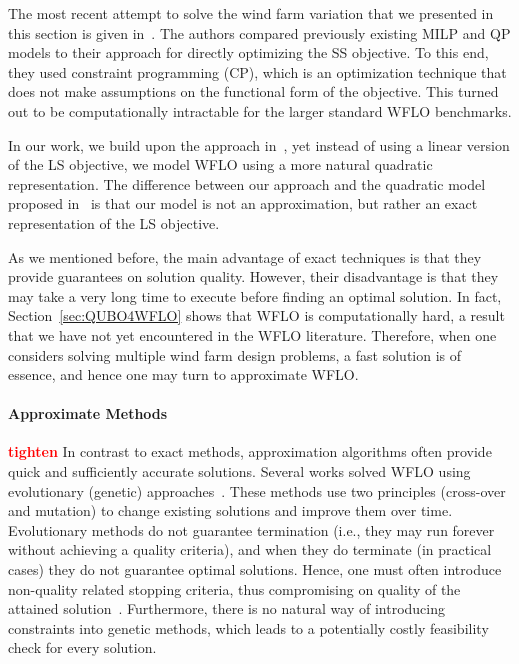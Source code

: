 \documentclass[preprint,12pt]{elsarticle}
\newcommand{\todo}[1]{{\textcolor{red}{\bf {#1}}}}
\begin{document}
The most recent attempt to solve the wind farm variation that we presented 
in this section is given in~\cite{Zhang2014}. The authors compared
previously existing MILP and QP models to their approach for directly optimizing the SS objective. To this end, they used constraint programming (CP), which 
is an optimization technique that does not make assumptions on the functional form of the objective.
This turned out to be computationally intractable for the larger standard WFLO benchmarks. 

In our work, we build upon the approach in~\cite{donovan2005wind}, yet instead of using a linear version of the LS objective, we 
model WFLO using a more natural quadratic representation. The difference between our approach and the quadratic model
proposed in~\cite{turner2014new} is that our model is not an approximation, but rather an exact representation of the LS objective.

As we mentioned before, the main advantage of exact techniques
is that they provide guarantees on solution quality. However, their disadvantage is
that they may take a very long time to execute before finding an optimal solution. 
In fact, Section~\ref{sec:QUBO4WFLO} shows that WFLO is computationally hard, a result
that we have not yet encountered in the WFLO literature. Therefore,
when one considers solving multiple wind farm design problems, a fast solution is of essence,
and hence one may turn to approximate WFLO.

\paragraph{Approximate Methods} \todo{tighten} In contrast to exact methods, approximation algorithms often provide   
quick and sufficiently accurate solutions. Several works solved 
WFLO using evolutionary (genetic) approaches~\cite{MOSETTI1994105,gonzalez2010optimization,grady2005placement}. 
These methods use two principles (cross-over and mutation)
to change existing solutions and improve them over time. Evolutionary methods do not guarantee termination 
(i.e., they may run forever without achieving a quality criteria), and when they do terminate (in practical cases) they do
not guarantee optimal solutions. Hence, one must often
introduce non-quality related stopping criteria, 
thus compromising on quality of the attained solution~\cite{davis1991handbook}.
Furthermore, there is no natural way of introducing constraints into genetic methods, which
leads to a potentially costly feasibility check for every solution. 
\end{document}
